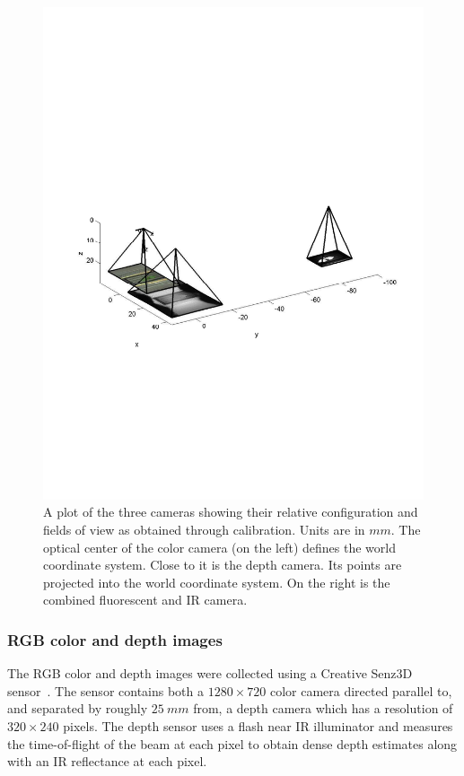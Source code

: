 \begin{figure}
  \includegraphics[width=\linewidth,trim=50 230 45 300,clip]{Figures/CameraConfiguration}
\caption{A plot of the three cameras showing their relative configuration and fields of view as obtained through calibration.  Units are in $mm$.  The optical center of the color camera (on the left) defines the world coordinate system.  Close to it is the depth camera.  Its points are projected into the world coordinate system.  On the right is the combined fluorescent and IR camera.}
\label{fig:CameraConfiguration}
\end{figure}

\subsubsection{RGB color and depth images} %

The RGB color and depth images were collected using a Creative Senz3D sensor~\cite{nguyen2015vietnamese}. The sensor contains both a $1280 \times 720$ color camera directed parallel to, and separated by roughly $25~mm$ from, a depth camera which has a resolution of $320\times240$ pixels. 
The depth sensor uses a flash near IR illuminator and measures the time-of-flight of the beam at each pixel to obtain dense depth estimates along with an IR reflectance at each pixel.

